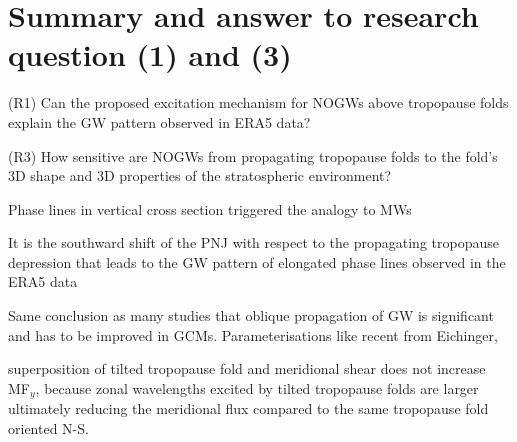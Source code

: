 
\section{Summary and answer to research question (1) and (3)}

\begin{tcolorbox}[]
    (R1) Can the proposed excitation mechanism for NOGWs above tropopause folds explain the GW pattern observed in ERA5 data?
\end{tcolorbox}

\begin{tcolorbox}[]
    (R3) How sensitive are NOGWs from propagating tropopause folds to the fold's 3D shape and 3D properties of the stratospheric environment?
\end{tcolorbox}

Phase lines in vertical cross section triggered the analogy to MWs

It is the southward shift of the PNJ with respect to the propagating tropopause depression that leads to the GW pattern of elongated phase lines observed in the ERA5 data %

Same conclusion as many studies that oblique propagation of GW is significant and has to be improved in GCMs. Parameterisations like recent from Eichinger, 

superposition of tilted tropopause fold and meridional shear does not increase MF$_y$, because zonal wavelengths excited by tilted tropopause folds are larger ultimately reducing the meridional flux compared to the same tropopause fold oriented N-S.


